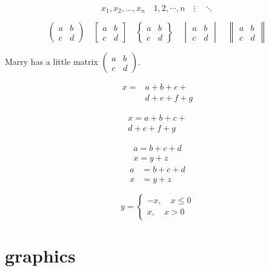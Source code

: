 \documentclass[UTF8]{ctexart}
\begin{document}
\[ x_1,x_2,\dots ,x_n\quad 1,2,\cdots ,n\quad
\vdots\quad \ddots \]

\[ \begin{pmatrix} a&b\\c&d \end{pmatrix} \quad
\begin{bmatrix} a&b\\c&d \end{bmatrix} \quad
\begin{Bmatrix} a&b\\c&d \end{Bmatrix} \quad
\begin{vmatrix} a&b\\c&d \end{vmatrix} \quad
\begin{Vmatrix} a&b\\c&d \end{Vmatrix} \]

Marry has a little matrix $ ( \begin{smallmatrix} a&b\\c&d \end{smallmatrix} ) $.

\[\begin{aligned}
x ={}& a+b+c+{} \\
&d+e+f+g
\end{aligned}\]

\begin{multline}
x = a+b+c+{} \\
d+e+f+g
\end{multline}

\begin{gather}
a = b+c+d \\
x = y+z
\end{gather}
\begin{align}
a &= b+c+d \\
x &= y+z
\end{align}

\[ y= \begin{cases}
-x,\quad x\leq 0 \\
x,\quad x>0
\end{cases} \]

\section{graphics}
\end{document}
